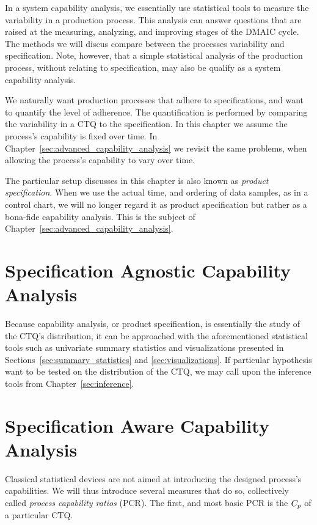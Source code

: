 \documentclass[12pt,a4paper]{report}
\begin{document}
In a system capability analysis, we essentially use statistical tools to measure the variability in a production process.
This analysis can answer questions that are raised at the measuring, analyzing, and improving stages of the DMAIC cycle. 
The methods we will discus compare between the processes variability and specification. 
Note, however, that a simple statistical analysis of the production process, without relating to specification, may also be qualify as a system capability analysis.

We naturally want production processes that adhere to specifications, and want to quantify the level of adherence.
The quantification is performed by comparing the variability in a CTQ to the specification.
In this chapter we assume the process’s capability is fixed over time. 
In Chapter~\ref{sec:advanced_capability_analysis} we revisit the same problems, when allowing the process’s capability to vary over time. 

The particular setup discusses in this chapter is also known as \emph{product specification}.
When we use the actual time, and ordering of data samples, as in a control chart, we will no longer regard it as product specification but rather as a bona-fide capability analysis. This is the subject of Chapter~\ref{sec:advanced_capability_analysis}.
 
 
\section{Specification Agnostic Capability Analysis}
 
Because capability analysis, or product specification, is essentially the study of the CTQ's distribution, it can be approached with the aforementioned statistical tools such as univariate summary statistics and visualizations presented in Sections~\ref{sec:summary_statistics} and \ref{sec:visualizations}.
If particular hypothesis want to be tested on the distribution of the CTQ, we may call upon the inference tools from Chapter~\ref{sec:inference}.

\section{Specification Aware Capability Analysis}
Classical statistical devices are not aimed at introducing the designed process's capabilities.
We will thus introduce several measures that do so, collectively called \emph{process capability ratios} (PCR).
The first, and most basic PCR is the $C_p$ of a particular CTQ.
\end{document}
